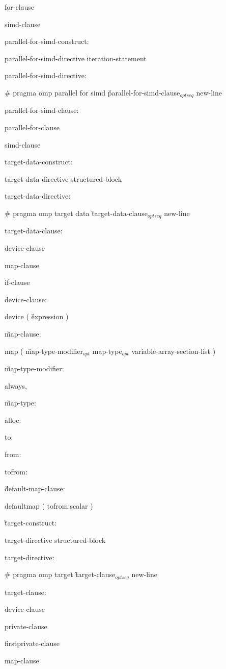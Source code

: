 {\I for-clause

\I simd-clause

parallel-for-simd-construct:

\I parallel-for-simd-directive iteration-statement

parallel-for-simd-directive:

\C\I \# pragma omp parallel for simd \G parallel-for-simd-clause$_{optseq}$ new-line

parallel-for-simd-clause:

\I parallel-for-clause

\I simd-clause

target-data-construct:

\I target-data-directive structured-block

target-data-directive:

\C\I \# pragma omp target data \G target-data-clause$_{optseq}$ new-line

target-data-clause:

\I device-clause

\I map-clause

\I if-clause

device-clause:

\C\I device ( \G expression \C )

\G map-clause:

\C\I map ( \G map-type-modifier$_{opt}$ map-type$_{opt}$ variable-array-section-list \C )

\G map-type-modifier:

\C\I always,

\G map-type:

\C\I alloc:

\I to:

\I from:

\I tofrom:

\G default-map-clause:

\C\I defaultmap ( tofrom:scalar ) 

\G target-construct:

\I target-directive structured-block

target-directive:

\C\I \# pragma omp target \G target-clause$_{optseq}$ new-line

target-clause:

\I device-clause

\I private-clause

\I firstprivate-clause

\I map-clause

}
